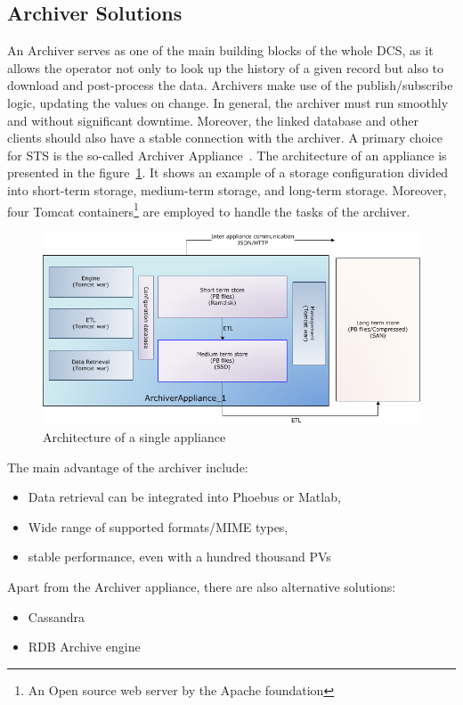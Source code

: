 \subsection{Archiver Solutions} \label{archiver}
An Archiver serves as one of the main building blocks of the whole \gls{DCS}, as it allows the operator not only to look up the history of a given record but also to download and post-process the data. Archivers make use of the publish/subscribe logic, updating the values on change. In general, the archiver must run smoothly and without significant downtime. Moreover, the linked database and other clients should also have a stable connection with the archiver. A primary choice for STS is the so-called Archiver Appliance~\cite{archiver_appliance}. The architecture of an appliance is presented in the figure~\ref{fig_archiver}. It shows an example of a storage configuration divided into short-term storage, medium-term storage, and long-term storage. Moreover, four Tomcat containers\footnote[1]{An Open source web server by the Apache foundation} are employed to handle the tasks of the archiver.  
\begin{figure}[!h]
\centering
\includegraphics[width=0.7\columnwidth]{Chapter4/images/applarch.png}
\caption{Architecture of a single appliance \cite{archiver_appliance}}
\label{fig_archiver}
\end{figure}
\newline

The main advantage of the archiver include: 

\begin{itemize}
    \item Data retrieval can be integrated into Phoebus or Matlab,
    \item Wide range of supported formats/MIME types,
    \item stable performance, even with a hundred thousand \gls{PV}s
\end{itemize}
Apart from the Archiver appliance, there are also alternative solutions:

\begin{itemize}
    \item Cassandra \cite{cassandra_archive}
    \item RDB Archive engine \cite{rdb_archive}
\end{itemize}

